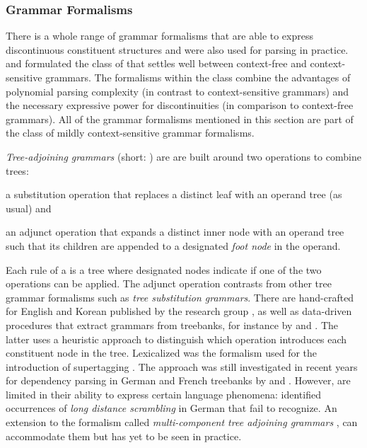 \documentclass[../document.tex]{subfiles}
\begin{document}
    \subsubsection*{Grammar Formalisms}
    There is a whole range of grammar formalisms that are able to express discontinuous constituent structures and were also used for parsing in practice.
     and \citet{Weir88} formulated the class of  that settles well between context-free and context-sensitive grammars.
    The formalisms within the class combine the advantages of polynomial parsing complexity (in contrast to context-sensitive grammars) and the necessary expressive power for discontinuities (in comparison to context-free grammars).
    All of the grammar formalisms mentioned in this section are part of the class of mildly context-sensitive grammar formalisms.

    \emph{Tree-adjoining grammars} (short: ) \citep{JosLevTak75} are are built around two operations to combine trees:
    \begin{compactitem}
        \item a substitution operation that replaces a distinct leaf with an operand tree (as usual) and
        \item an adjunct operation that expands a distinct inner node with an operand tree such that its children are appended to a designated \emph{foot node} in the operand.
    \end{compactitem}
    Each rule of a  is a tree where designated nodes indicate if one of the two operations can be applied.
    The adjunct operation contrasts  from other tree grammar formalisms such as \emph{tree substitution grammars}.
    There are hand-crafted  for English \citep{xtag01} and Korean \citep{xtag02} published by the  research group \citep{Doran99}, as well as data-driven procedures that extract grammars from treebanks, for instance by \citet{xia1999extracting} and \citet{Bla18}.
    The latter uses a heuristic approach to distinguish which operation introduces each constituent node in the tree.
    Lexicalized  was the formalism used for the introduction of supertagging \citep{bangalore1999supertagging}.
    The approach was still investigated in recent years for dependency parsing in German and French treebanks by \citet{Kas17} and \citet{Bla18}.
    However,  are limited in their ability to express certain language phenomena: \citet{Becker91} identified occurrences of \emph{long distance scrambling} in German that  fail to recognize.
    An extension to the formalism called \emph{multi-component tree adjoining grammars} \citep{VijWeiJos87,Weir88}, can accommodate them but has yet to be seen in practice.
\end{document}
